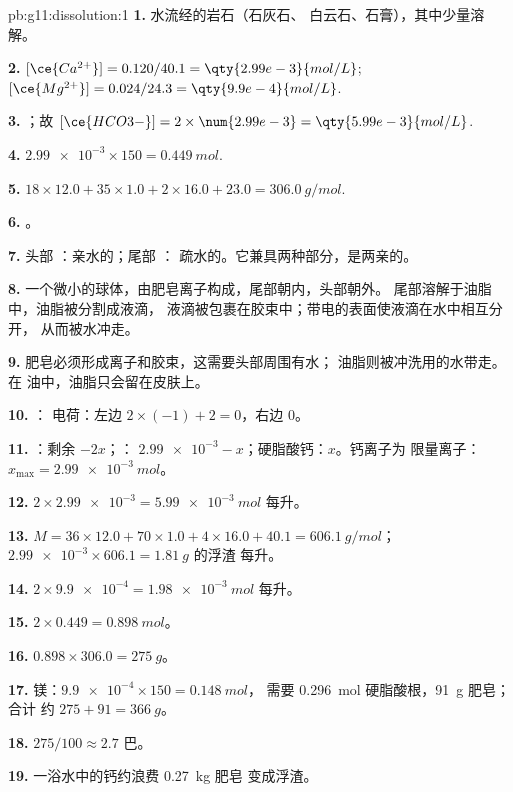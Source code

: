 \begin{solution}{pb:g11:dissolution:1}
\textbf{1.} 水流经的岩石（石灰石、
白云石、石膏），其中少量溶解。

\textbf{2.} $[\ce{Ca^{2+}}] = 0.120 / 40.1 = \qty{2.99e-3}{mol/L}$;
$[\ce{Mg^{2+}}] = 0.024 / 24.3 = \qty{9.9e-4}{mol/L}$.

\textbf{3.} ；故
$[\ce{HCO3-}] = 2 \times \num{2.99e-3} = \qty{5.99e-3}{mol/L}$.

\textbf{4.} $\num{2.99e-3} \times 150 = \qty{0.449}{mol}$.

\textbf{5.} $18 \times 12.0 + 35 \times 1.0 + 2 \times 16.0 + 23.0 =
\qty{306.0}{g/mol}$.

\textbf{6.} 。

\textbf{7.} 头部 ：亲水的；尾部 ：
疏水的。它兼具两种部分，是两亲的。

\textbf{8.} 一个微小的球体，由肥皂离子构成，尾部朝内，头部朝外。
尾部溶解于油脂中，油脂被分割成液滴，
液滴被包裹在胶束中；带电的表面使液滴在水中相互分开，
从而被水冲走。

\textbf{9.} 肥皂必须形成离子和胶束，这需要头部周围有水；
油脂则被冲洗用的水带走。在
油中，油脂只会留在皮肤上。

\textbf{10.} ：
电荷：左边 $2 \times (-1) + 2 = 0$，右边 $0$。

\textbf{11.} ：剩余 $- 2x$；：
$\num{2.99e-3} - x$；硬脂酸钙：$x$。钙离子为
限量离子：$x_{\max} = \qty{2.99e-3}{mol}$。

\textbf{12.} $2 \times \num{2.99e-3} = \qty{5.99e-3}{mol}$ 每升。

\textbf{13.} $M = 36 \times 12.0 + 70 \times 1.0 + 4 \times 16.0 + 40.1 =
\qty{606.1}{g/mol}$；$\num{2.99e-3} \times 606.1 = \qty{1.81}{g}$ 的浮渣
每升。

\textbf{14.} $2 \times \num{9.9e-4} = \qty{1.98e-3}{mol}$ 每升。

\textbf{15.} $2 \times 0.449 = \qty{0.898}{mol}$。

\textbf{16.} $0.898 \times 306.0 = \qty{275}{g}$。

\textbf{17.} 镁：$\num{9.9e-4} \times 150 = \qty{0.148}{mol}$，
需要 \qty{0.296}{mol} 硬脂酸根，\qty{91}{g} 肥皂；合计
约 $275 + 91 = \qty{366}{g}$。

\textbf{18.} $275 / 100 \approx 2.7$ 巴。

\textbf{19.} 一浴水中的钙约浪费 \qty{0.27}{kg} 肥皂
变成浮渣。
\end{solution}
